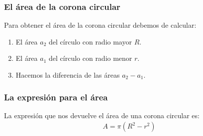 \documentclass[14pt]{beamer}
\begin{document}
\begin{frame}
\frametitle{El área de la corona circular}
Para obtener el área de la corona circular debemos de calcular:
\begin{enumerate}[<+->]
\item El área $a_{2}$ del círculo con radio mayor $R$.
\item El área $a_{1}$ del círculo con radio menor $r$.
\item Hacemos la diferencia de las áreas $a_{2} - a_{1}$.
\end{enumerate}
\end{frame}
\begin{frame}
\frametitle{La expresión para el área}
La expresión que nos devuelve el área de una corona circular es:
\pause
\begin{align*}
A = \pi (R^{2} - r^{2})
\end{align*}
\end{frame}
\end{document}
